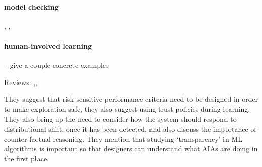 \paragraph{model checking}
\cite{Laskey1991-mf}, \cite{Zagorecki2015-qy}, \cite{Ghosh2016-dl}

\paragraph{human-involved learning}
\cite{Freitas2006-qo} -- give a couple concrete examples

Reviews: \cite{Lacave2002-cu},\cite{Van_Belle2012-dt},


They suggest that risk-sensitive performance criteria need to be designed in order to make exploration safe, they also suggest using trust policies during learning. They also bring up the need to consider how the system should respond to distributional shift, once it has been detected, and also discuss the importance of counter-factual reasoning. They mention that studying `transparency' in ML algorithms is important so that designers can understand what AIAs are doing in the first place.
